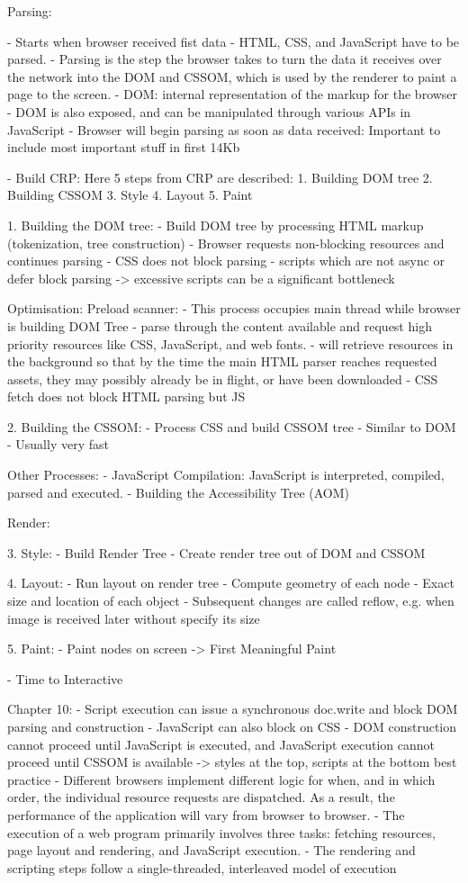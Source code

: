 Parsing:

- Starts when browser received fist data
- HTML, CSS, and JavaScript have to be parsed.
- Parsing is the step the browser takes to turn the data it receives over the network into the DOM and CSSOM, which is used by the renderer to paint a page to the screen.
- DOM: internal representation of the markup for the browser
- DOM is also exposed, and can be manipulated through various APIs in JavaScript
- Browser will begin parsing as soon as data received: Important to include most important stuff in first 14Kb

- Build CRP: Here 5 steps from CRP are described:
1. Building DOM tree
2. Building CSSOM
3. Style
4. Layout
5. Paint

1. Building the DOM tree:
- Build DOM tree by processing HTML markup (tokenization, tree construction)
- Browser requests non-blocking resources and continues parsing
- CSS does not block parsing
- scripts which are not async or defer block parsing -> excessive scripts can be a significant bottleneck

Optimisation: Preload scanner:
- This process occupies main thread while browser is building DOM Tree
- parse through the content available and request high priority resources like CSS, JavaScript, and web fonts.
- will retrieve resources in the background so that by the time the main HTML parser reaches requested assets, they may possibly already be in flight, or have been downloaded
- CSS fetch does not block HTML parsing but JS

2. Building the CSSOM:
- Process CSS and build CSSOM tree
- Similar to DOM
- Usually very fast


Other Processes:
- JavaScript Compilation: JavaScript is interpreted, compiled, parsed and executed.
- Building the Accessibility Tree (AOM)


Render:

3. Style:
- Build Render Tree
- Create render tree out of DOM and CSSOM

4. Layout:
- Run layout on render tree
- Compute geometry of each node
- Exact size and location of each object
- Subsequent changes are called reflow, e.g. when image is received later without specify its size

5. Paint:
- Paint nodes on screen
-> First Meaningful Paint

- Time to Interactive



Chapter 10:
- Script execution can issue a synchronous doc.write and block DOM parsing and construction
- JavaScript can also block on CSS
- DOM construction cannot proceed until JavaScript is executed, and JavaScript execution cannot proceed until CSSOM is available
-> styles at the top, scripts at the bottom best practice
- Different browsers implement different logic for when, and in which order, the individual resource requests are dispatched. As a result, the performance of the application will vary from browser to browser.
- The execution of a web program primarily involves three tasks: fetching resources, page layout and rendering, and JavaScript execution.
- The rendering and scripting steps follow a single-threaded, interleaved model of execution




